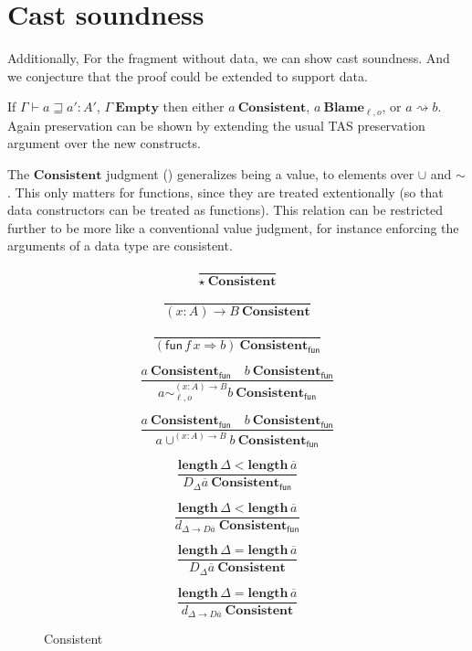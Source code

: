 \section{Cast soundness}

Additionally, For the fragment without data, we can show cast soundness.
And we conjecture that the proof could be extended to support data.
 
If $\varGamma\vdash a\sqsupseteq a':A'$, $\varGamma\ \mathbf{Empty}$ then either $a\ \mathbf{Consistent}$, $a\ \mathbf{Blame}_{\ell,o}$, or $a\rightsquigarrow b$.
Again preservation can be shown by extending the usual \ac{TAS} preservation argument over the new constructs.

The $\mathbf{Consistent}$ judgment () generalizes being a value, to elements over $\cup$ and $\sim$.
This only matters for functions, since they are treated extentionally (so that data constructors can be treated as functions).
This relation can be restricted further to be more like a conventional value judgment, for instance enforcing the arguments of a data type are consistent.

\begin{figure}
\[
\frac{\ }{\star\ \mathbf{Consistent}}
\]

\[
\frac{\ }{\left(x:A\right)\rightarrow B\ \mathbf{Consistent}}
\]

\[
\frac{\ }{\left(\mathsf{fun}\,f\,x\Rightarrow b\right)\ \mathbf{Consistent_{\mathsf{fun}}}}
\]

\[
\frac{
  a\ \mathbf{Consistent_{\mathsf{fun}}}\quad b\ \mathbf{Consistent_{\mathsf{fun}}}
}{
  a\sim_{\ell,o}^{\left(x:A\right)\rightarrow B}b\ \mathbf{Consistent_{\mathsf{fun}}}}
\]

\[
\frac{
  a\ \mathbf{Consistent_{\mathsf{fun}}}\quad b\ \mathbf{Consistent_{\mathsf{fun}}}
}{
  a\cup^{\left(x:A\right)\rightarrow B}b\ \mathbf{Consistent_{\mathsf{fun}}}
}
\]

\[
\frac{
  \mathbf{length}\,\Delta < \mathbf{length}\,\overline{a}
}{
  D_{\Delta}\overline{a}\ \mathbf{Consistent_{\mathsf{fun}}}
}
\]

\[
\frac{
  \mathbf{length}\,\Delta < \mathbf{length}\,\overline{a}
}{
  d_{\Delta\rightarrow D\overline{a}}\ \mathbf{Consistent_{\mathsf{fun}}}
}
\]

\[
\frac{
  \mathbf{length}\,\Delta = \mathbf{length}\,\overline{a}
}{
  D_{\Delta}\overline{a}\ \mathbf{Consistent}
}
\]

\[
\frac{
  \mathbf{length}\,\Delta = \mathbf{length}\,\overline{a}
}{
  d_{\Delta\rightarrow D\overline{a}}\ \mathbf{Consistent}
}
\]

\caption{Consistent}
\label{fig:cast-data-val}
\end{figure}


